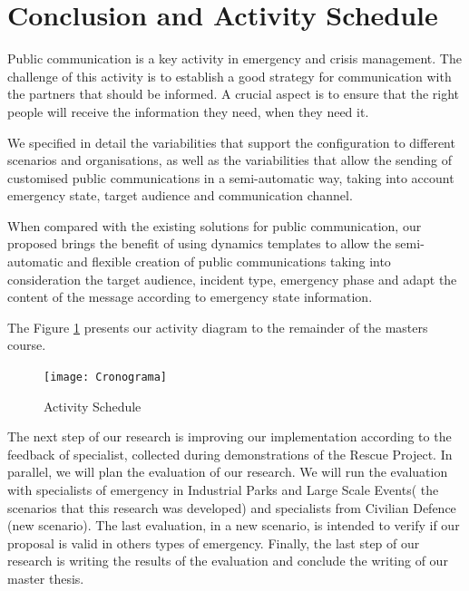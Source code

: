 \section{Conclusion and Activity Schedule}

Public communication is a key activity in emergency and crisis management. The challenge of this activity is to establish a good strategy for communication with the partners that should be informed. A crucial aspect is to ensure that the right people will receive the information they need, when they need it.

We specified in detail the variabilities that support the configuration to different scenarios and organisations, as well as the variabilities that allow the sending of customised public communications in a semi-automatic way, taking into account emergency state, target audience and communication channel.

When compared with the existing solutions for public communication, our proposed brings the benefit of using dynamics templates to allow the semi-automatic and flexible creation of public communications taking into consideration the target audience, incident type, emergency phase and adapt the content of the message according to emergency state information.

The Figure \ref{fig:Schendule} presents our activity diagram to the remainder of the masters course.

\begin{figure}[!h]
\begin{center}
  \texttt{[image: Cronograma]}
\caption{Activity Schedule}
\label{fig:Schendule}
\end{center}
\end{figure}


The next step of our research is improving our implementation according to the feedback of specialist, collected during demonstrations of the Rescue Project. In parallel, we will plan the evaluation of our research. We will run the evaluation with specialists of emergency in Industrial Parks and Large Scale Events( the scenarios that this research was developed) and specialists from Civilian Defence (new scenario). The last evaluation, in a new scenario, is intended to verify if our proposal is valid in others types of emergency. Finally, the last step of our research is writing the results of the evaluation and conclude the writing of our master thesis. 

